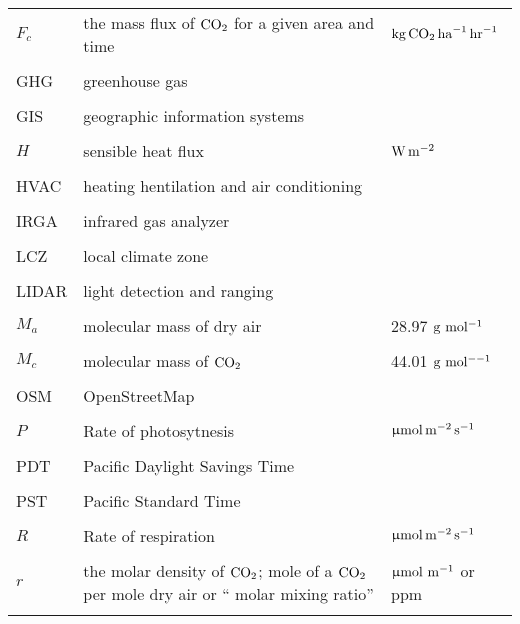 \begin{longtable}{L{3cm}L{6cm}L{3cm}}
$F_c$ 	&	the mass flux of $\rm{CO}_2$ for a given area and time		&  $\rm{kg}\,\rm{CO}_2\,\rm{ha}^{-1}\,\rm{hr}^{-1}$ \\\\


GHG & greenhouse gas & \\\\

GIS & geographic information systems & \\\\

$H$	& sensible heat flux  	& $\rm{W} \, \rm{m}^{-2}$ \\\\

HVAC & heating hentilation and air conditioning & \\\\

IRGA & infrared gas analyzer & \\\\

LCZ & local climate zone & \\\\

LIDAR & light detection and ranging & \\\\

$M_{a}$ 	&	molecular mass of dry air		&  28.97 $\rm{g\ mol^{-1}}$ \\\\

$M_{c}$		& 	molecular mass of $\rm{CO}_2$		 & 44.01 $\rm{g\ mol^{--1}}$ \\\\

OSM & OpenStreetMap & \\\\

${P}$ & Rate of photosytnesis & $\upmu\rm{mol\, m^{-2}\, s^{-1}}$ \\\\

PDT & Pacific Daylight Savings Time \\\\
PST & Pacific Standard Time & \\\\

${R}$ & Rate of respiration & $\upmu\rm{mol\, m^{-2}\, s^{-1}}$ \\\\

$r$			&	the molar density of $\rm{CO}_2$; mole of a $\rm{CO}_2$ per mole dry air or `` molar mixing ratio'' 	&  $\upmu\rm{mol\ m^{-1}}$ or ppm \\\\


\end{longtable}
